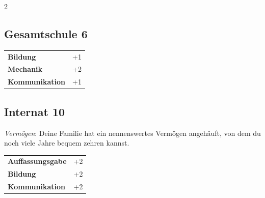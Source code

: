 \begin{multicols}{2}
\begin{tcolorbox}
\end{tcolorbox}

\begin{tcolorbox}
    \subsection*{Gesamtschule \hfill \small{6 }}
    \tcblower




\begin{tabular}{@{}ll@{}}
    \textbf{Bildung} & +1\\
    \textbf{Mechanik} & +2\\
    \textbf{Kommunikation} & +1\\
\end{tabular}


\end{tcolorbox}

\begin{tcolorbox}
    \subsection*{Internat \hfill \small{10 }}
    \tcblower
\textit{Vermögen}: Deine Familie hat ein nennenswertes Vermögen angehäuft, von dem du noch viele Jahre bequem zehren kannst.


\vspace{3mm}

\begin{tabular}{@{}ll@{}}
    \textbf{Auffassungsgabe} & +2\\
    \textbf{Bildung} & +2\\
    \textbf{Kommunikation} & +2\\
\end{tabular}


\end{tcolorbox}


\end{multicols}
